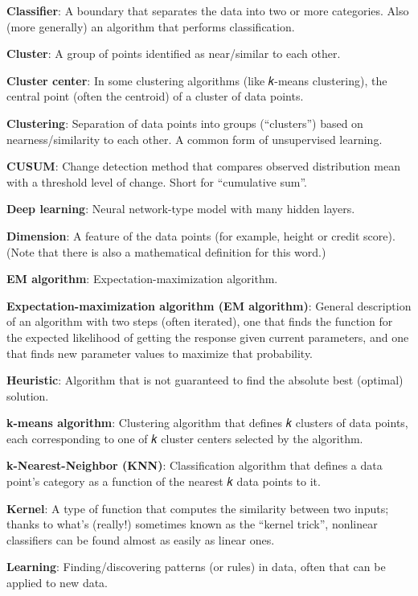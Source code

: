 \documentclass[
]{book}
\begin{document}
\textbf{Classifier}: A boundary that separates the data into two or more categories. Also (more generally) an algorithm that performs classification.

\textbf{Cluster}: A group of points identified as near/similar to each other.

\textbf{Cluster center}: In some clustering algorithms (like 𝑘-means clustering), the central point (often the centroid) of a cluster of data points.

\textbf{Clustering}: Separation of data points into groups (``clusters'') based on nearness/similarity to each other. A common form of unsupervised learning.

\textbf{CUSUM}: Change detection method that compares observed distribution mean with a threshold level of change. Short for ``cumulative sum''.

\textbf{Deep learning}: Neural network-type model with many hidden layers.

\textbf{Dimension}: A feature of the data points (for example, height or credit score). (Note that there is also a mathematical definition for this word.)

\textbf{EM algorithm}: Expectation-maximization algorithm.

\textbf{Expectation-maximization algorithm (EM algorithm)}: General description of an algorithm with two steps (often iterated), one that finds the function for the expected likelihood of getting the response given current parameters, and one that finds new parameter values to maximize that probability.

\textbf{Heuristic}: Algorithm that is not guaranteed to find the absolute best (optimal) solution.

\newpage

\textbf{k-means algorithm}: Clustering algorithm that defines 𝑘 clusters of data points, each corresponding to one of 𝑘 cluster centers selected by the algorithm.

\textbf{k-Nearest-Neighbor (KNN)}: Classification algorithm that defines a data point's category as a function of the nearest 𝑘 data points to it.

\textbf{Kernel}: A type of function that computes the similarity between two inputs; thanks to what's (really!) sometimes known as the ``kernel trick'', nonlinear classifiers can be found almost as easily as linear ones.

\textbf{Learning}: Finding/discovering patterns (or rules) in data, often that can be applied to new data.
\end{document}
